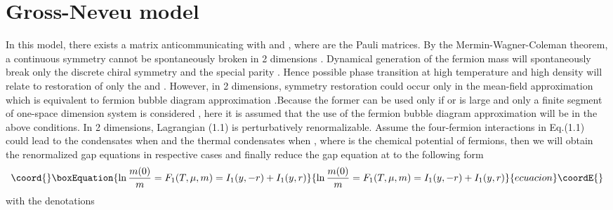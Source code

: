 \documentclass[a4paper,eqsecnum]{revtex4}
\begin{document}
\section{\coordHE{} Gross-Neveu model\label{sec:2D}}
\indent In this model\cite{kn:17}, there exists a matrix 
\coordHE{} anticommunicating with \coordHE{} and 
\coordHE{}, where \coordHE{} are the Pauli matrices. By the 
Mermin-Wagner-Coleman theorem, a continuous symmetry cannot be spontaneously broken 
in 2 dimensions \cite{kn:19}. Dynamical generation of the fermion mass will 
spontaneously break only the discrete chiral symmetry 
\coordHE{} and  the special parity \coordHE{}. Hence possible phase transition at
high temperature and high density will relate to restoration of only the \coordHE{}
and \coordHE{}. However, in 2 dimensions, symmetry restoration could occur only 
in the mean-field approximation \cite{kn:6,kn:20} which is equivalent to fermion 
bubble diagram approximation \cite{kn:17}.Because the former can be used only if 
\coordHE{} or \coordHE{} is large and only a finite segment of one-space dimension
system is considered \cite{kn:20}, here it is assumed that the use of the fermion 
bubble diagram approximation will be in the above conditions. In 2 dimensions, 
Lagrangian (1.1) is perturbatively renormalizable. Assume the four-fermion 
interactions in Eq.(1.1) could lead to the condensates  
\coordHE{} when \coordHE{} and the thermal 
condensates \coordHE{} when \coordHE{}, where \myHighlight{$\mu$}\coordHE{} is the chemical potential of fermions, then we will obtain the 
renormalized gap equations in respective cases and finally reduce the gap equation 
at \coordHE{} to the following form
\begin{equation}\coord{}\boxEquation{
\ln \frac{m(0)}{m}=F_1(T,\mu,m)=I_1(y,-r)+I_1(y,r)
}{
\ln \frac{m(0)}{m}=F_1(T,\mu,m)=I_1(y,-r)+I_1(y,r)
}{ecuacion}\coordE{}\end{equation}%
with the denotations 
\end{document}
